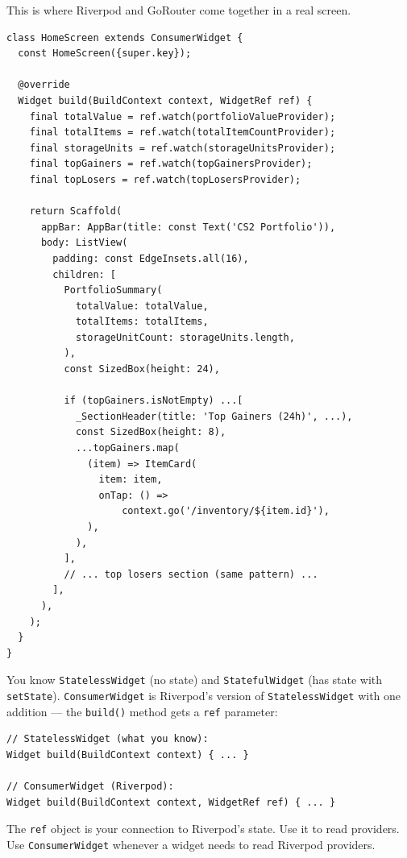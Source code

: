 \documentclass[11pt, a4paper]{article}
\begin{document}
This is where Riverpod and GoRouter come together in a real screen.

\begin{lstlisting}
class HomeScreen extends ConsumerWidget {
  const HomeScreen({super.key});

  @override
  Widget build(BuildContext context, WidgetRef ref) {
    final totalValue = ref.watch(portfolioValueProvider);
    final totalItems = ref.watch(totalItemCountProvider);
    final storageUnits = ref.watch(storageUnitsProvider);
    final topGainers = ref.watch(topGainersProvider);
    final topLosers = ref.watch(topLosersProvider);

    return Scaffold(
      appBar: AppBar(title: const Text('CS2 Portfolio')),
      body: ListView(
        padding: const EdgeInsets.all(16),
        children: [
          PortfolioSummary(
            totalValue: totalValue,
            totalItems: totalItems,
            storageUnitCount: storageUnits.length,
          ),
          const SizedBox(height: 24),

          if (topGainers.isNotEmpty) ...[
            _SectionHeader(title: 'Top Gainers (24h)', ...),
            const SizedBox(height: 8),
            ...topGainers.map(
              (item) => ItemCard(
                item: item,
                onTap: () =>
                    context.go('/inventory/${item.id}'),
              ),
            ),
          ],
          // ... top losers section (same pattern) ...
        ],
      ),
    );
  }
}
\end{lstlisting}

\begin{conceptbox}[title=\textbf{ConsumerWidget (Riverpod)}]
You know \texttt{StatelessWidget} (no state) and \texttt{StatefulWidget} (has state with \texttt{setState}). \texttt{ConsumerWidget} is Riverpod's version of \texttt{StatelessWidget} with one addition --- the \texttt{build()} method gets a \texttt{ref} parameter:

\begin{lstlisting}[numbers=none]
// StatelessWidget (what you know):
Widget build(BuildContext context) { ... }

// ConsumerWidget (Riverpod):
Widget build(BuildContext context, WidgetRef ref) { ... }
\end{lstlisting}

The \texttt{ref} object is your connection to Riverpod's state. Use it to read providers. Use \texttt{ConsumerWidget} whenever a widget needs to read Riverpod providers.
\end{conceptbox}
\end{document}
